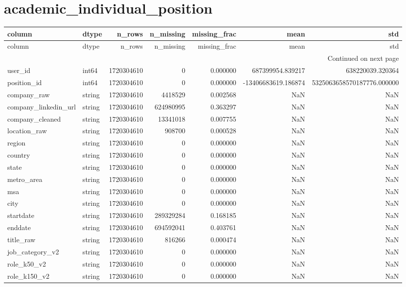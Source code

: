 \documentclass{article}
\begin{document}
\section*{academic_individual_position}
\begin{longtable}{llrrrrr}
\toprule
column & dtype & n_rows & n_missing & missing_frac & mean & std \\
\midrule
\endfirsthead
\toprule
column & dtype & n_rows & n_missing & missing_frac & mean & std \\
\midrule
\endhead
\midrule
\multicolumn{7}{r}{Continued on next page} \\
\midrule
\endfoot
\bottomrule
\endlastfoot
user_id & int64 & 1720304610 & 0 & 0.000000 & 687399954.839217 & 638220039.320364 \\
position_id & int64 & 1720304610 & 0 & 0.000000 & -13406683619.186874 & 5325063658570187776.000000 \\
company_raw & string & 1720304610 & 4418529 & 0.002568 & NaN & NaN \\
company_linkedin_url & string & 1720304610 & 624980995 & 0.363297 & NaN & NaN \\
company_cleaned & string & 1720304610 & 13341018 & 0.007755 & NaN & NaN \\
location_raw & string & 1720304610 & 908700 & 0.000528 & NaN & NaN \\
region & string & 1720304610 & 0 & 0.000000 & NaN & NaN \\
country & string & 1720304610 & 0 & 0.000000 & NaN & NaN \\
state & string & 1720304610 & 0 & 0.000000 & NaN & NaN \\
metro_area & string & 1720304610 & 0 & 0.000000 & NaN & NaN \\
msa & string & 1720304610 & 0 & 0.000000 & NaN & NaN \\
city & string & 1720304610 & 0 & 0.000000 & NaN & NaN \\
startdate & string & 1720304610 & 289329284 & 0.168185 & NaN & NaN \\
enddate & string & 1720304610 & 694592041 & 0.403761 & NaN & NaN \\
title_raw & string & 1720304610 & 816266 & 0.000474 & NaN & NaN \\
job_category_v2 & string & 1720304610 & 0 & 0.000000 & NaN & NaN \\
role_k50_v2 & string & 1720304610 & 0 & 0.000000 & NaN & NaN \\
role_k150_v2 & string & 1720304610 & 0 & 0.000000 & NaN & NaN \\

\end{longtable}
\end{document}

